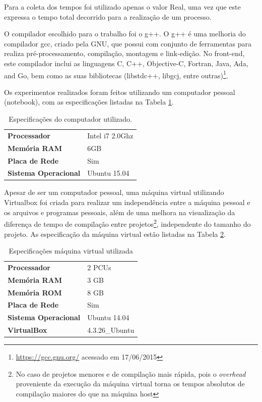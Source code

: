 Para a coleta dos tempos foi utilizado apenas o valor Real, uma vez que este
 expressa o tempo total decorrido para a realização de um processo.

O compilador escolhido para o trabalho foi o g++. O g++ é uma melhoria do
 compilador gcc, criado pela GNU, que possui com conjunto de ferramentas
 para realiza pré-processamento, compilação, montagem e link-edição.
 No front-end,  este compilador inclui as linguagens C, C++, Objective-C,
 Fortran, Java, Ada, and Go, bem como as suas bibliotecas  (libstdc++,
 libgcj, entre outras)\footnote{\url{https://gcc.gnu.org/} acessado
 em 17/06/2015}.


Os experimentos realizados foram feitos utilizando um computador pessoal
 (notebook), com  as especificações  listadas na Tabela 
\ref{tab:especificacoes_hardware}.


\begin{table}[h]
\centering
\caption{Especificações do computador utilizado.}
\label{tab:especificacoes_hardware}
\begin{tabular}{ll}
	\toprule
	\textbf{Processador}& Intel i7 2.0Ghz \\
	\textbf{Memória RAM}         & 6GB             \\
	\textbf{Placa de Rede}       & Sim             \\
	\textbf{Sistema Operacional} & Ubuntu 15.04 \\
	\bottomrule
\end{tabular}
\end{table}


Apesar de ser um computador pessoal, uma máquina virtual utilizando Virtualbox
 foi criada para realizar um independência entre a máquina pessoal e os
 arquivos e programas pessoais, além de uma melhora  na visualização da
 diferença de tempo de compilação entre projetos\footnote{No caso de projetos menores e de compilação mais rápida, pois o 
\textit{overhead} proveniente da execução da máquina virtual torna os tempos
 absolutos de compilação maiores do que na máquina host}, independente do
 tamanho do projeto. As especificação da máquina virtual  estão listadas na
 Tabela \ref{tab:especificacoes_vm}.

\begin{table}[h]
	\centering
	\begin{tabular}{ll}
		\toprule
		\textbf{Processador} & 2 PCUs \\
		\textbf{Memória RAM} & 3 GB \\
		\textbf{Memória ROM} & 8 GB \\
		\textbf{Placa de Rede} & Sim \\
		\textbf{Sistema Operacional} & Ubuntu 14.04 \\
		\textbf{VirtualBox} & 4.3.26\_Ubuntu \\
		\bottomrule
	\end{tabular}
	\caption{Especificações máquina virtual utilizada}
	\label{tab:especificacoes_vm}
\end{table}


